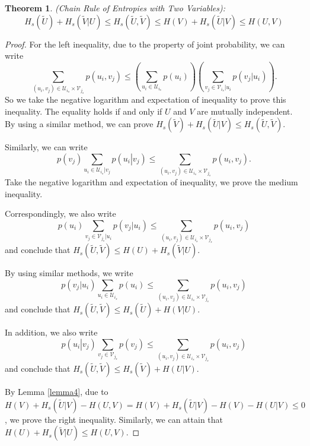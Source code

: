 \documentclass[12pt, draftclsnofoot,onecolumn]{IEEEtran}
\newtheorem{theorem}{\bf{Theorem}}
\begin{document}
\begin{theorem}\label{theorem2}
(\textit{Chain Rule of Entropies with Two Variables}):
\begin{equation}\label{chain_rule}
H_s(\tilde{U})+H_s(\tilde{V}\left|U\right.) \leq H_s(\tilde{U},\tilde{V})\leq H(V)+H_s(\tilde{U}\left|V\right.) \leq H(U,V)
\end{equation}
\end{theorem}
\begin{proof}
For the left inequality, due to the property of joint probability, we can write
\begin{equation}
\sum_{(u_i,v_j)\in \mathcal{U}_{i_s}\times  \mathcal{V}_{j_s}}p(u_i,v_j)\leq \left(\sum_{u_i \in \mathcal{U}_{i_s}}p(u_i)\right)\left(\sum_{v_j\in  \mathcal{V}_{i_s}|u_i}p(v_j\left|u_i\right.)\right).
\end{equation}
So we take the negative logarithm and expectation of inequality to prove this inequality. The equality holds if and only if $U$ and $V$ are mutually independent. By using a similar method, we can prove $H_s(\tilde{V})+H_s(\tilde{U}\left|V\right.) \leq H_s(\tilde{U},\tilde{V})$.

Similarly, we can write
\begin{equation}
p\left(v_j\right)\sum_{u_i\in \mathcal{U}_{i_s}|v_j}p\left(u_i\left|v_j\right.\right) \leq \sum_{(u_i,v_j)\in \mathcal{U}_{i_s}\times  \mathcal{V}_{j_s}}p\left(u_i,v_j\right).
\end{equation}
Take the negative logarithm and expectation of inequality, we prove the medium inequality.

Correspondingly, we also write
\begin{equation}
p\left(u_i\right)\sum_{v_j\in \mathcal{V}_{j_s}|u_i}p\left(v_j\left|u_i\right.\right) \leq \sum_{(u_i,v_j)\in \mathcal{U}_{i_s}\times  \mathcal{V}_{j_s}}p\left(u_i,v_j\right)
\end{equation}
and conclude that $H_s(\tilde{U},\tilde{V})\leq H(U) + H_s(\tilde{V}|U)$.

By using similar methods, we write
\begin{equation}
p(v_j\left|u_i\right.) \sum_{u_i\in \mathcal{U}_{i_s}} p\left(u_i\right) \leq \sum_{(u_i,v_j)\in \mathcal{U}_{i_s}\times  \mathcal{V}_{j_s}}p\left(u_i,v_j\right)
\end{equation}
and conclude that $H_s(\tilde{U},\tilde{V})\leq H_s(\tilde{U})+H(V\left|U\right.) $.

In addition, we also write
\begin{equation}
p\left(u_i\left|v_j\right.\right) \sum_{v_j\in \mathcal{V}_{j_s}} p\left(v_j\right) \leq \sum_{(u_i,v_j)\in \mathcal{U}_{i_s}\times  \mathcal{V}_{j_s}}p\left(u_i,v_j\right)
\end{equation}
and conclude that $H_s(\tilde{U},\tilde{V})\leq H_s(\tilde{V})+H(U\left|V\right.)$.

By Lemma \ref{lemma4}, due to $H(V)+H_s(\tilde{U}|V)-H(U, V) = H(V)+H_s(\tilde{U}|V)-H(V)-H(U|V)\leq 0$, we prove the right inequality. Similarly, we can attain that $H(U) + H_s(\tilde{V}|U) \leq H(U,V)$.
\end{proof}
\end{document}

